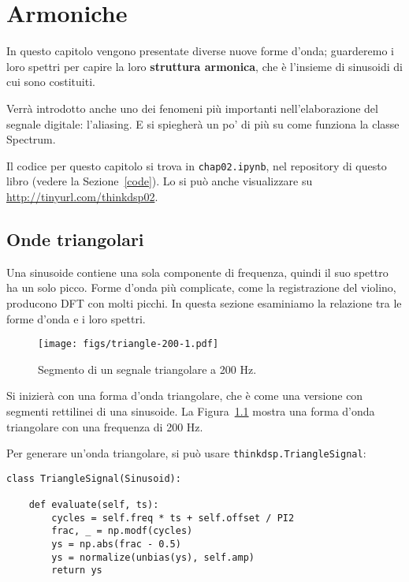 \documentclass[12pt]{book} \usepackage[width=5.5in,height=8.5in, hmarginratio=3:2,vmarginratio=1:1]{geometry}
\begin{document}
\chapter{Armoniche} \label{harmonics} 

In questo capitolo vengono presentate diverse nuove forme d'onda; guarderemo i loro spettri per capire la loro {\bf struttura armonica}, che è l'insieme di sinusoidi di cui sono costituiti.

Verrà introdotto anche uno dei fenomeni più importanti nell'elaborazione del segnale digitale: l'aliasing. E si spiegherà un po' di più su come funziona la classe Spectrum.

Il codice per questo capitolo si trova in {\tt chap02.ipynb}, nel repository di questo libro (vedere la Sezione~\ref{code}). Lo si può anche visualizzare su \url{http://tinyurl.com/thinkdsp02}.

\section{Onde triangolari} \label{triangle} 

Una sinusoide contiene una sola componente di frequenza, quindi il suo spettro ha un solo picco. Forme d'onda più complicate, come la registrazione del violino, producono DFT con molti picchi. In questa sezione esaminiamo la relazione tra le forme d'onda e i loro spettri.

\begin{figure} 

\centerline{\texttt{[image: figs/triangle-200-1.pdf]}} \caption{Segmento di un segnale triangolare a 200 Hz.} \label{fig.triangle.200.1} \end{figure} 

Si inizierà con una forma d'onda triangolare, che è come una versione con segmenti rettilinei di una sinusoide. La Figura~\ref{fig.triangle.200.1} mostra una forma d'onda triangolare con una frequenza di 200 Hz.

Per generare un'onda triangolare, si può usare {\tt thinkdsp.TriangleSignal}:

\begin{verbatim} 
class TriangleSignal(Sinusoid):

    def evaluate(self, ts):
        cycles = self.freq * ts + self.offset / PI2
        frac, _ = np.modf(cycles)
        ys = np.abs(frac - 0.5)
        ys = normalize(unbias(ys), self.amp)
        return ys
 \end{verbatim} 
\end{document}

